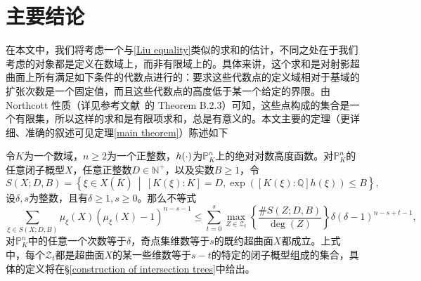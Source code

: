 \section{主要结论}
在本文中，我们将考虑一个与\eqref{Liu equality}类似的求和的估计，不同之处在于我们考虑的对象都是定义在数域上，而非有限域上的。具体来讲，这个求和是对射影超曲面上所有满足如下条件的代数点进行的：要求这些代数点的定义域相对于基域的扩张次数是一个固定值，而且这些代数点的高度低于某一个给定的界限。由 Northcott 性质（详见参考文献~的 Theorem B.2.3）可知，这些点构成的集合是一个有限集，所以这样的求和是有限项求和，总是有意义的。本文主要的定理（更详细、准确的叙述可见定理\ref{main theorem}）陈述如下
\begin{theorem} \label{intro-main result}
令$K$为一个数域，$n \geqslant 2$为一个正整数，$h(\ndot)$为$\mathbb P^n_K$上的绝对对数高度函数。对$\mathbb{P}^n_K$的任意闭子概型$X$，任意正整数$D \in \mathbb{N}^+$，以及实数$B \geqslant 1$，令
\begin{equation}
S(X;D,B) = \left\{ \xi\in X(\overline{K}) \ \middle|\ [K(\xi):K]=D, \exp\left([K(\xi): \mathbb{Q}] h(\xi)\right) \leqslant B \right\},
\end{equation}
设$\delta, s$为整数，且有$\delta \geqslant 1, s \geqslant 0$。那么不等式
\begin{equation}
\sum_{\xi\in S(X;D,B)} \mu_{\xi}(X)(\mu_{\xi}(X)-1)^{n-s-1} \leqslant \sum_{t=0}^s \max_{Z\in\mathcal Z_t} \left\{ \frac{\#S(Z;D,B)}{\deg(Z)} \right\} \delta(\delta-1)^{n-s+t-1},
\end{equation}
对$\mathbb{P}^n_K$中的任意一个次数等于$\delta$，奇点集维数等于$s$的既约超曲面$X$都成立。上式中，每个$\mathcal Z_t$都是超曲面$X$的某一些维数等于$s-t$的特定的闭子概型组成的集合，具体的定义将在\S\ref{construction of intersection trees}中给出。
\end{theorem}


